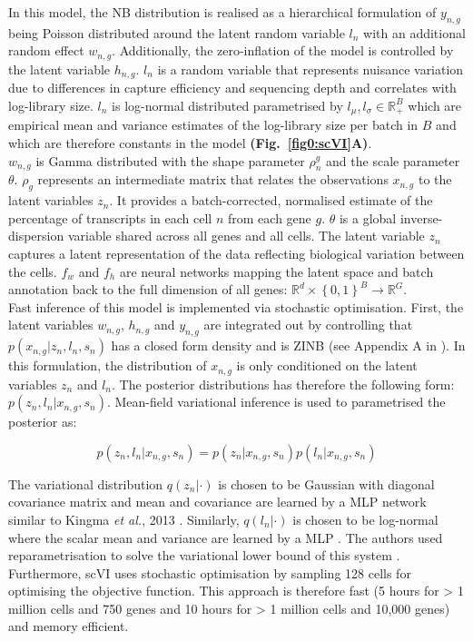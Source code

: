 In this model, the NB distribution is realised as a hierarchical formulation of $y_{n,g}$ being Poisson distributed around the latent random variable $l_n$ with an additional random effect $w_{n,g}$. Additionally, the zero-inflation of the model is controlled by the latent variable $h_{n,g}$. 
$l_n$ is a random variable that represents nuisance variation due to differences in capture efficiency and sequencing depth and correlates with log-library size. 
$l_n$ is log-normal distributed parametrised by $l_\mu,l_\sigma\in\mathbb{R}^B_+$ which are empirical mean and variance estimates of the log-library size per batch in $B$ and which are therefore constants in the model \textbf{(Fig.~\ref{fig0:scVI}A)}.\\

$w_{n,g}$ is Gamma distributed with the shape parameter $\rho_n^g$ and the scale parameter $\theta$. $\rho_g$ represents an intermediate matrix that relates the observations $x_{n,g}$ to the latent variables $z_n$. 
It provides a batch-corrected, normalised estimate of the percentage of transcripts in each cell $n$ from each gene $g$. 
$\theta$ is a global inverse-dispersion variable shared across all genes and all cells. 
The latent variable $z_n$ captures a latent representation of the data reflecting biological variation between the cells. 
$f_w$ and $f_h$ are neural networks mapping the latent space and batch annotation back to the full dimension of all genes: $\mathbb{R}^d\times{}\left\lbrace0,1\right\rbrace^B\rightarrow\mathbb{R}^G$.\\

Fast inference of this model is implemented via stochastic optimisation. First, the latent variables $w_{n,g}$, $h_{n,g}$ and $y_{n,g}$ are integrated out by controlling that $p(x_{n,g}|z_n,l_n,s_n)$ has a closed form density and is ZINB (see Appendix A in \citep{Lopez2018}). 
In this formulation, the distribution of $x_{n,g}$ is only conditioned on the latent variables $z_n$ and $l_n$. 
The posterior distributions has therefore the following form: $p(z_n,l_n|x_{n,g},s_n)$. Mean-field variational inference is used to parametrised the posterior as:

\begin{equation}
p(z_n,l_n|x_{n,g},s_n)=p(z_n|x_{n,g},s_n)p(l_n|x_{n,g},s_n)
\end{equation} 

The variational distribution $q(z_n|\cdot)$ is chosen to be Gaussian with diagonal covariance matrix and mean and covariance are learned by a \gls{MLP} network similar to Kingma \emph{et al.}, 2013 \citep{Kingma2013}. 
Similarly, $q(l_n|\cdot)$ is chosen to be log-normal where the scalar mean and variance are learned by a MLP \citep{Kingma2013}. 
The authors used reparametrisation to solve the variational lower bound of this system \cite{Lopez2018, Kingma2013}. 
Furthermore, scVI uses stochastic optimisation by sampling 128 cells for optimising the objective function. 
This approach is therefore fast (5 hours for > 1 million cells and 750 genes and 10 hours for > 1 million cells and 10,000 genes) and memory efficient. \\

